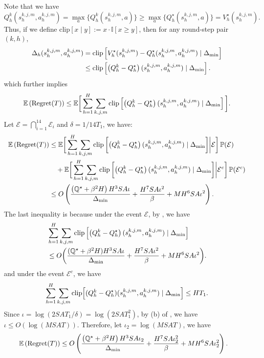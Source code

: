 \documentclass{article}
\def\dmin{\Delta_{\textnormal{min}}}
\begin{document}
Note that we have
$$Q_h^k (s_h^{k,j,m}, a_h^{k,j,m}) = \max_a\{Q_h^k (s_h^{k,j,m},a) \} \geq \max_a\{Q_h^{\star} (s_h^{k,j,m},a) \} = V_h^{\star}(s_h^{k,j,m}).$$ Thus, if we define $\text{clip}[x \mid y] := x \cdot \mathbb{I}[x \geq y]$, then for any round-step pair $(k,h)$, 
\begin{align*}
    \Delta_h(s_h^{k,j,m}, a_h^{k,j,m}) &= \mathrm{clip}\left[V_h^{\star}(s_h^{k,j,m}) - Q_h^{\star}(s_h^{k,j,m}, a_h^{k,j,m}) \mid \dmin\right] \\
    &\leq \mathrm{clip}\left[\left(Q_h^k - Q_h^{\star}\right)(s_h^{k,j,m}, a_h^{k,j,m}) \mid \dmin\right].
\end{align*}
 which further implies
\begin{equation*}
    \mathbb{E}\left(\textnormal{Regret}(T)\right)\leq \mathbb{E} \bigg[\sum_{h=1}^{H}\sum_{k,j,m}\mathrm{clip}\left[\left(Q_h^k - Q_h^{\star}\right)(s_h^{k,j,m}, a_h^{k,j,m}) \mid \dmin\right]\bigg].
\end{equation*}
Let $\mathcal{E} = \bigcap_{i=1}^{14}\mathcal{E}_i$ and $\delta = 1/14T_1$, we have:
\begin{align*}
    \mathbb{E}\left(\textnormal{Regret}(T)\right)
    &\leq  \mathbb{E} \bigg[\sum_{h=1}^{H}\sum_{k,j,m}\mathrm{clip}\left[\left(Q_h^k - Q_h^{\star}\right)(s_h^{k,j,m}, a_h^{k,j,m}) \mid \dmin\bigg] \bigg| \mathcal{E}\right]\mathbb{P}(\mathcal{E}) \nonumber\\
    &\quad + \mathbb{E} \bigg[\sum_{h=1}^{H}\sum_{k,j,m}\mathrm{clip}\left[\left(Q_h^k - Q_h^{\star}\right)(s_h^{k,j,m}, a_h^{k,j,m}) \mid \dmin\bigg] \bigg|  \mathcal{E}^c\right]\mathbb{P}(\mathcal{E}^c) \nonumber\\
    &\leq O\left(\frac{\left(\mathbb{Q}^\star+\beta^2H\right)H^3SA \iota}{\dmin}  + \frac{H^7SA\iota^2}{\beta}+ MH^6SA\iota^2\right).
\end{align*}
The last inequality is because under the event $\mathcal{E}$, by , we have
\begin{align*}
    &\sum_{h=1}^{H}\sum_{k,j,m}\mathrm{clip}\left[\left(Q_h^k - Q_h^{\star}\right)(s_h^{k,j,m}, a_h^{k,j,m}) \mid \dmin\right]\\
    &\leq O\bigg(\frac{(\mathbb{Q}^\star+\beta^2H)H^3SA \iota}{\dmin}  + \frac{H^7SA\iota^2}{\beta}+ MH^6SA\iota^2\bigg).
\end{align*}
and under the event $\mathcal{E}^c$, we have
$$\sum_{h=1}^{H}\sum_{k,j,m}\mathrm{clip}\Big[(Q_h^k - Q_h^{\star})(s_h^{k,j,m}, a_h^{k,j,m}) \mid \dmin\Big] \leq HT_1.$$
Since $\iota = \log (2SAT_1/\delta) = \log (2SAT^2_1)$, by (b) of , we have $\iota \leq O\left(\log(MSAT)\right)$. Therefore, let $\iota_2 = \log (MSAT)$, we have 
\begin{align*}
    &\mathbb{E}\left(\textnormal{Regret}(T)\right) 
    \leq O\left(\frac{\left(\mathbb{Q}^\star+\beta^2H\right)H^3SA\iota_2}{\dmin}+   \frac{H^7SA\iota_2^2}{\beta}+ MH^6SA\iota_2^2\right).
\end{align*}
\end{document}
